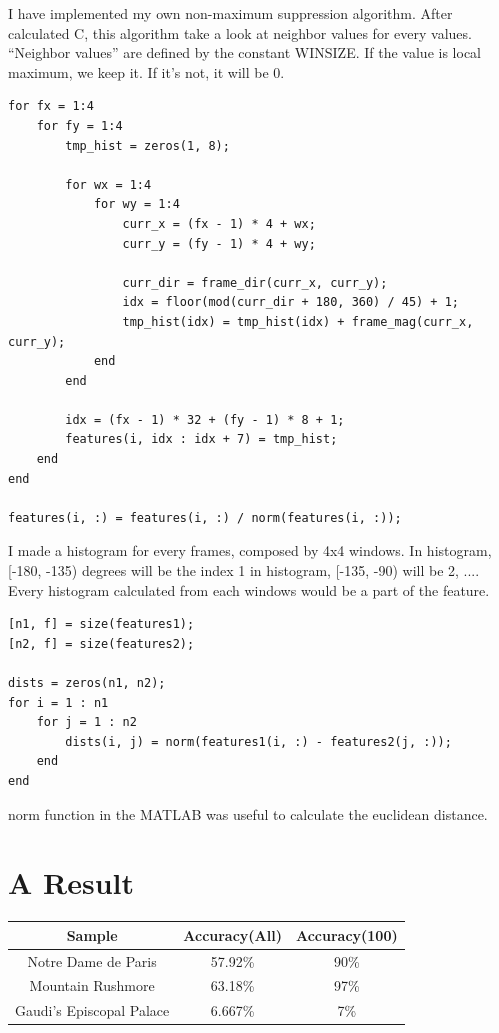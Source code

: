 I have implemented my own non-maximum suppression algorithm. After calculated C, this algorithm take a look at neighbor values for every values.
``Neighbor values'' are defined by the constant WINSIZE. If the value is local maximum, we keep it. If it's not, it will be 0.

\begin{lstlisting}[style=Matlab-editor]
for fx = 1:4
    for fy = 1:4
        tmp_hist = zeros(1, 8);
        
        for wx = 1:4
            for wy = 1:4
                curr_x = (fx - 1) * 4 + wx;
                curr_y = (fy - 1) * 4 + wy;

                curr_dir = frame_dir(curr_x, curr_y);
                idx = floor(mod(curr_dir + 180, 360) / 45) + 1;
                tmp_hist(idx) = tmp_hist(idx) + frame_mag(curr_x, curr_y);
            end
        end

        idx = (fx - 1) * 32 + (fy - 1) * 8 + 1;
        features(i, idx : idx + 7) = tmp_hist;
    end
end

features(i, :) = features(i, :) / norm(features(i, :));
\end{lstlisting}

I made a histogram for every frames, composed by 4x4 windows. In histogram, [-180, -135) degrees will be the index 1 in histogram, [-135, -90) will be 2, ....
Every histogram calculated from each windows would be a part of the feature.

\vspace{1cm}

\begin{lstlisting}[style=Matlab-editor]
[n1, f] = size(features1);
[n2, f] = size(features2);

dists = zeros(n1, n2);
for i = 1 : n1
    for j = 1 : n2
        dists(i, j) = norm(features1(i, :) - features2(j, :));
    end
end
\end{lstlisting}
norm function in the MATLAB was useful to calculate the euclidean distance.

\pagebreak

\section*{A Result}

\begin{table}[!htbp]
    \centering
    \begin{tabular}{c | cc}
     Sample & Accuracy(All) & Accuracy(100)  \\ \hline
     Notre Dame de Paris &  57.92\% & 90\% \\
     Mountain Rushmore & 63.18\% & 97\%  \\
     Gaudi's Episcopal Palace & 6.667\% & 7\% \\
    \end{tabular}
\end{table}


